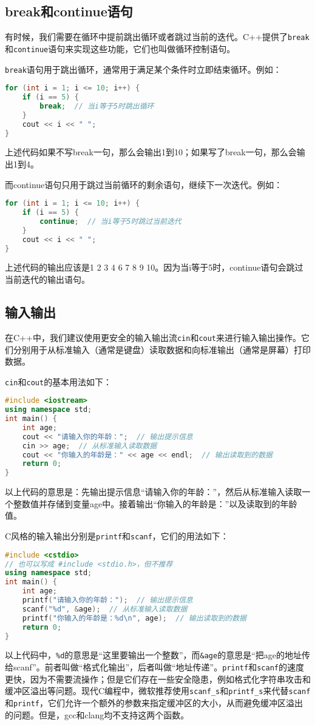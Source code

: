 \documentclass[../main.tex]{subfiles}
\begin{document}
\subsection{break和continue语句}

有时候，我们需要在循环中提前跳出循环或者跳过当前的迭代。C++提供了\texttt{break}和\texttt{continue}语句来实现这些功能，它们也叫做循环控制语句。

\texttt{break}语句用于跳出循环，通常用于满足某个条件时立即结束循环。例如：
\begin{lstlisting}[language=C++]
for (int i = 1; i <= 10; i++) {
    if (i == 5) {
        break;  // 当i等于5时跳出循环
    }
    cout << i << " ";
}
\end{lstlisting}
上述代码如果不写break一句，那么会输出1到10；如果写了break一句，那么会输出1到4。

而continue语句只用于跳过当前循环的剩余语句，继续下一次迭代。例如：
\begin{lstlisting}[language=C++]
for (int i = 1; i <= 10; i++) {
    if (i == 5) {
        continue;  // 当i等于5时跳过当前迭代
    }
    cout << i << " ";
}
\end{lstlisting}
上述代码的输出应该是1 2 3 4 6 7 8 9 10。因为当i等于5时，continue语句会跳过当前迭代的输出语句。

\subsection{输入输出}

在C++中，我们建议使用更安全的输入输出流\texttt{cin}和\texttt{cout}来进行输入输出操作。它们分别用于从标准输入（通常是键盘）读取数据和向标准输出（通常是屏幕）打印数据。

\texttt{cin}和\texttt{cout}的基本用法如下：
\begin{lstlisting}[language=C++]
#include <iostream>
using namespace std;
int main() {
    int age;
    cout << "请输入你的年龄：";  // 输出提示信息
    cin >> age;  // 从标准输入读取数据
    cout << "你输入的年龄是：" << age << endl;  // 输出读取到的数据
    return 0;
}
\end{lstlisting}
以上代码的意思是：先输出提示信息“请输入你的年龄：”，然后从标准输入读取一个整数值并存储到变量age中。接着输出“你输入的年龄是：”以及读取到的年龄值。

C风格的输入输出分别是\texttt{printf}和\texttt{scanf}，它们的用法如下：
\begin{lstlisting}[language=C++]
#include <cstdio>
// 也可以写成 #include <stdio.h>，但不推荐
using namespace std;
int main() {
    int age;
    printf("请输入你的年龄：");  // 输出提示信息
    scanf("%d", &age);  // 从标准输入读取数据
    printf("你输入的年龄是：%d\n", age);  // 输出读取到的数据
    return 0;
}
\end{lstlisting}
以上代码中，\texttt{\%d}的意思是“这里要输出一个整数”，而\texttt{\&age}的意思是“把age的地址传给scanf”。前者叫做“格式化输出”，后者叫做“地址传递”。\texttt{printf}和\texttt{scanf}的速度更快，因为不需要流操作；但是它们存在一些安全隐患，例如格式化字符串攻击和缓冲区溢出等问题。现代C编程中，微软推荐使用\texttt{scanf\_s}和\texttt{printf\_s}来代替\texttt{scanf}和\texttt{printf}，它们允许一个额外的参数来指定缓冲区的大小，从而避免缓冲区溢出的问题。但是，gcc和clang均不支持这两个函数。
\end{document}
